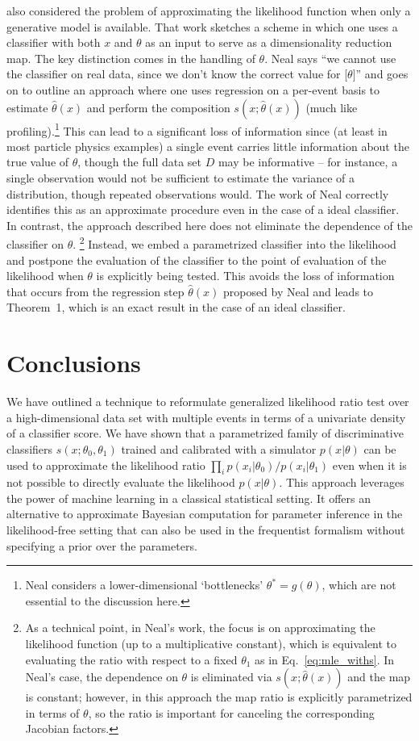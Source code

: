 \documentclass[aoas,preprint]{imsart}
\numberwithin{equation}{section}
\theoremstyle{plain}
\begin{document}
\cite{Neal:2007zz} also considered the problem of approximating the likelihood function when only a generative model is available. That work sketches a scheme in which one uses a classifier with both $x$ and $\theta$ as an input to serve as a dimensionality reduction map. 
The key distinction comes in the handling of $\theta$.  Neal says  ``we cannot use the classifier on real data, since we don't know the correct value for [$\theta]$'' and goes on to outline an approach where one uses regression on a per-event basis to estimate $\hat{\theta}(x)$ and perform the composition $s(x; \hat{\theta}(x))$ (much like profiling).\footnote{Neal considers a lower-dimensional `bottlenecks' $\theta^*=g(\theta)$, which are not essential to the discussion here.}  This can lead to a significant loss of information since (at least in most particle physics examples) a single event carries little information about the true value of $\theta$, though the full data set $D$ may be informative -- for instance, a single observation would not be sufficient to estimate the variance of a distribution, though repeated observations would.  The work of Neal correctly identifies this as an approximate procedure even in the case of a ideal classifier. In contrast, the approach described here does not eliminate the dependence of the classifier on $\theta$.%
\footnote{As a technical point, in Neal's work, the focus is on approximating the likelihood function (up to a multiplicative constant), which is equivalent to evaluating the ratio  with respect to a fixed $\theta_1$ as in Eq.~\ref{eq:mle_withs}. In Neal's case, the dependence on $\theta$ is eliminated via $s(x; \hat{\theta}(x))$ and the map is constant; however, in this approach the map ratio is explicitly parametrized in terms of $\theta$, so the ratio is important for canceling the corresponding Jacobian factors.} Instead, we embed a parametrized classifier into the likelihood and postpone the evaluation of the classifier to the point of evaluation of the likelihood when $\theta$ is explicitly being tested. This avoids the loss of information that occurs from the regression step $\hat{\theta}(x)$ proposed by Neal and leads to Theorem~1, which is an exact result in the case of an ideal classifier. 


\section{Conclusions}

We have outlined a technique to reformulate generalized likelihood ratio test over a high-dimensional data set with multiple events in terms of a univariate density of a classifier score. 
We have shown that a parametrized family of discriminative classifiers $s(x; \theta_0, \theta_1)$ trained and calibrated with a simulator  $p(x|\theta)$ can be used to approximate the  likelihood ratio  $\prod_i p(x_i|\theta_0)/p(x_i|\theta_1)$ even when it is not possible to directly evaluate the likelihood $p(x|\theta)$.   This approach leverages the power of machine learning in a classical statistical setting. It offers an alternative to approximate Bayesian computation for parameter inference in the likelihood-free setting that can also be used in the frequentist formalism without specifying a prior over the parameters. 
\end{document}
